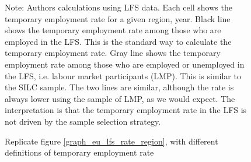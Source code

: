 \begin{figure}[htp!]
    \caption{Replicate figure \ref{graph_eu_lfs_rate_region}, with different definitions of temporary employment rate}
    \label{graph_rate_region_compare_lmp}
    \footnotesize{Note: Authors calculations using LFS data.  Each cell shows the temporary employment rate for a given region, year.  Black line shows the temporary employment rate among those who are employed in the LFS.  This is the standard way to calculate the temporary employment rate.  Gray line shows the temporary employment rate among those who are employed or unemployed in the LFS, i.e. labour market participants (LMP).  This is similar to the SILC sample.  The two lines are similar, although the rate is always lower using the sample of LMP, as we would expect.  The interpretation is that the temporary employment rate in the LFS is not driven by the sample selection strategy.}
\end{figure}

